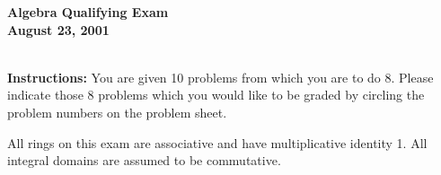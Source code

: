 \documentclass[12pt]{article}
\begin{document}

\begin{center}
{\bf  Algebra Qualifying Exam}\\ 
{\bf August 23, 2001}\\
\end{center}

\vspace{0.1in}
\noindent\hrulefill\\
{\bf Instructions:} You are given 10 problems from which you are to do 8.
 Please indicate those  8 problems which you would like  to be graded 
by circling the problem numbers on the  problem sheet. 

 All rings on this exam are associative and
have multiplicative identity 1. All  integral domains are 
assumed to be commutative.
\vspace{0.2in}

\end{document}

